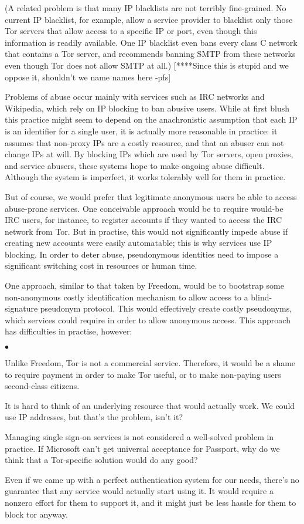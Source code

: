 \documentclass{llncs}
\newenvironment{tightlist}{\begin{list}{$\bullet$}{
  \setlength{\itemsep}{0mm}
    \setlength{\parsep}{0mm}
    }}{\end{list}}
\begin{document}
(A related problem is that many IP blacklists are not terribly fine-grained.
No current IP blacklist, for example, allow a service provider to blacklist
only those Tor servers that allow access to a specific IP or port, even
though this information is readily available.  One IP blacklist even bans
every class C network that contains a Tor server, and recommends banning SMTP
from these networks even though Tor does not allow SMTP at all.)
[****Since this is stupid and we oppose it, shouldn't we name names here -pfs]


Problems of abuse occur mainly with services such as IRC networks and
Wikipedia, which rely on IP blocking to ban abusive users.  While at first
blush this practice might seem to depend on the anachronistic assumption that
each IP is an identifier for a single user, it is actually more reasonable in
practice: it assumes that non-proxy IPs are a costly resource, and that an
abuser can not change IPs at will.  By blocking IPs which are used by Tor
servers, open proxies, and service abusers, these systems hope to make
ongoing abuse difficult.  Although the system is imperfect, it works
tolerably well for them in practice.

But of course, we would prefer that legitimate anonymous users be able to
access abuse-prone services.  One conceivable approach would be to require
would-be IRC users, for instance, to register accounts if they wanted to
access the IRC network from Tor.  But in practise, this would not
significantly impede abuse if creating new accounts were easily automatable;
this is why services use IP blocking.  In order to deter abuse, pseudonymous
identities need to impose a significant switching cost in resources or human
time.

One approach, similar to that taken by Freedom, would be to bootstrap some
non-anonymous costly identification mechanism to allow access to a
blind-signature pseudonym protocol.  This would effectively create costly
pseudonyms, which services could require in order to allow anonymous access.
This approach has difficulties in practise, however:
\begin{tightlist}
\item Unlike Freedom, Tor is not a commercial service.  Therefore, it would
  be a shame to require payment in order to make Tor useful, or to make
  non-paying users second-class citizens.
\item It is hard to think of an underlying resource that would actually work.
  We could use IP addresses, but that's the problem, isn't it?
\item Managing single sign-on services is not considered a well-solved
  problem in practice.  If Microsoft can't get universal acceptance for
  Passport, why do we think that a Tor-specific solution would do any good?
\item Even if we came up with a perfect authentication system for our needs,
  there's no guarantee that any service would actually start using it.  It
  would require a nonzero effort for them to support it, and it might just
  be less hassle for them to block tor anyway.
\end{tightlist}
\end{document}
